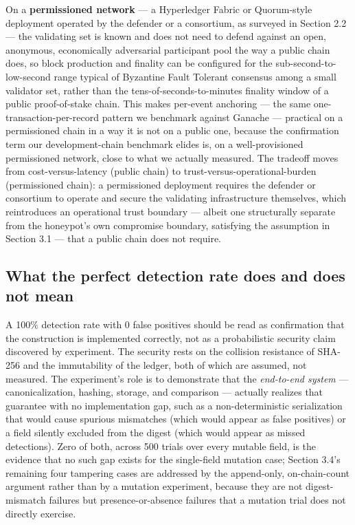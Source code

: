 \documentclass[journal]{IEEEtran}
\begin{document}
On a \textbf{permissioned network} --- a Hyperledger Fabric or Quorum-style deployment operated by the defender or a consortium, as surveyed in Section 2.2 --- the validating set is known and does not need to defend against an open, anonymous, economically adversarial participant pool the way a public chain does, so block production and finality can be configured for the sub-second-to-low-second range typical of Byzantine Fault Tolerant consensus among a small validator set, rather than the tens-of-seconds-to-minutes finality window of a public proof-of-stake chain. This makes per-event anchoring --- the same one-transaction-per-record pattern we benchmark against Ganache --- practical on a permissioned chain in a way it is not on a public one, because the confirmation term our development-chain benchmark elides is, on a well-provisioned permissioned network, close to what we actually measured. The tradeoff moves from cost-versus-latency (public chain) to trust-versus-operational-burden (permissioned chain): a permissioned deployment requires the defender or consortium to operate and secure the validating infrastructure themselves, which reintroduces an operational trust boundary --- albeit one structurally separate from the honeypot's own compromise boundary, satisfying the assumption in Section 3.1 --- that a public chain does not require.

\subsection{What the perfect detection rate does and does not mean}

A 100\% detection rate with 0 false positives should be read as confirmation that the construction is implemented correctly, not as a probabilistic security claim discovered by experiment. The security rests on the collision resistance of SHA-256 and the immutability of the ledger, both of which are assumed, not measured. The experiment's role is to demonstrate that the \emph{end-to-end system} --- canonicalization, hashing, storage, and comparison --- actually realizes that guarantee with no implementation gap, such as a non-deterministic serialization that would cause spurious mismatches (which would appear as false positives) or a field silently excluded from the digest (which would appear as missed detections). Zero of both, across 500 trials over every mutable field, is the evidence that no such gap exists for the single-field mutation case; Section 3.4's remaining four tampering cases are addressed by the append-only, on-chain-count argument rather than by a mutation experiment, because they are not digest-mismatch failures but presence-or-absence failures that a mutation trial does not directly exercise.
\end{document}
